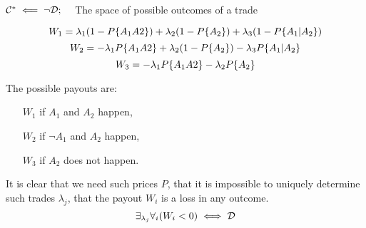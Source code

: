\begin{frame}{$\mathcal{C}^*\impliedby\neg\mathcal{D};\quad$ The space of possible outcomes of a trade}
\begin{minipage}{\linewidth}
\begin{minipage}{\linewidth}
\begingroup
\setlength{\abovedisplayskip}{3pt}
\setlength{\belowdisplayskip}{3pt}
$$W_1=\lambda_1(1-P\{A_1A2\})+\lambda_2(1-P\{A_2\})+\lambda_3(1-P\{A_1|A_2\})$$
$$W_2=-\lambda_1P\{A_1A2\}+\lambda_2(1-P\{A_2\})-\lambda_3P\{A_1|A_2\}$$
$$W_3=-\lambda_1P\{A_1A2\}-\lambda_2P\{A_2\}$$
\endgroup
\end{minipage}
\vfill

\bigskip
\begin{minipage}{\linewidth}
\begin{minipage}{0.4\linewidth}
The possible payouts are:
\begin{itemize}\itemsep0.5em
\item[$W_1$] if $A_1$ and $A_2$ happen, \\
\item[$W_2$]  if $\neg A_1$ and $A_2$ happen, \\
\item[$W_3$] if $A_2$ does not happen.
\end{itemize}
\end{minipage}
\hfill
\begin{minipage}{0.5\linewidth}
\bigskip
It is clear that we need such prices $P$, that it is impossible to uniquely determine such trades ${\lambda_j}$, that the payout $W_i$ is a loss in any outcome.
$$\exists_{\lambda_j}\forall{_i}(W_i<0)\iff\mathcal{D}$$
\end{minipage}
\end{minipage}
\end{minipage}
\end{frame}

